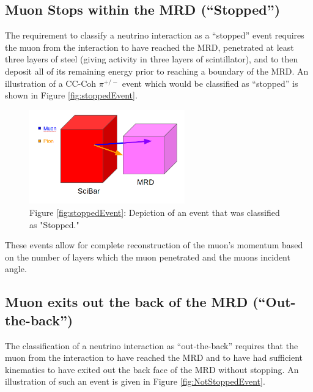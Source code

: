 \documentclass[11pt]{article}
\begin{document}
\subsection{Muon Stops within the MRD (``Stopped'')}\label{subsec:stoppedMRD}
The requirement to classify a neutrino interaction as a ``stopped'' event requires the muon from the interaction to have reached the MRD, penetrated at least three layers of steel (giving activity in three layers of scintillator), and to then deposit all of its remaining energy prior to reaching a boundary of the MRD. An illustration of a CC-Coh $\pi^{+/-}$ event which would be classified as ``stopped'' is shown in Figure \ref*{fig:stoppedEvent}.

\begin{figure}[H]
\centering
\includegraphics[width=0.6\textwidth]{EventClassifications/Stopped.png}
\caption*{Figure \ref*{fig:stoppedEvent}: Depiction of an event that was classified as "Stopped."}
\end{figure}\label{fig:stoppedEvent}

These events allow for complete reconstruction of the muon's momentum based on the number of layers which the muon penetrated and the muons incident angle.

\subsection{Muon exits out the back of the MRD (``Out-the-back'')}
The classification of a neutrino interaction as ``out-the-back'' requires that the muon from the interaction to have reached the MRD and to have had sufficient kinematics to have exited out the back face of the MRD without stopping. An illustration of such an event is given in Figure \ref*{fig:NotStoppedEvent}. 
\end{document}
